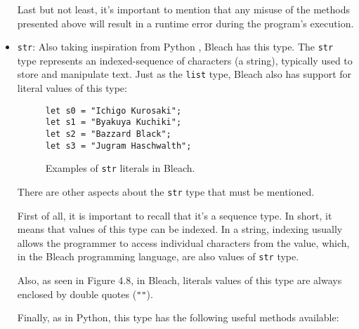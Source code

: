 \begin{itemize}
    Last but not least, it's important to mention that any misuse of the methods presented above will result in a runtime error during the program's execution.

    \item \texttt{str}: Also taking inspiration from Python \cite{python_language}, Bleach has this type. The \texttt{str} type represents an indexed-sequence of characters (a string), typically used to store and manipulate text. Just as the \texttt{list} type, Bleach also has support for literal values of this type:

    \begin{figure}[H]
        \centering
        \begin{lstlisting}
let s0 = "Ichigo Kurosaki";
let s1 = "Byakuya Kuchiki";
let s2 = "Bazzard Black";
let s3 = "Jugram Haschwalth";
        \end{lstlisting}
        \caption{Examples of \texttt{str} literals in Bleach.}
    \end{figure}

    There are other aspects about the \texttt{str} type that must be mentioned.

    First of all, it is important to recall that it's a sequence type. In short, it means that values of this type can be indexed. In a string, indexing usually allows the programmer to access individual characters from the value, which, in the Bleach programming language, are also values of \texttt{str} type.

    Also, as seen in Figure 4.8, in Bleach, literals values of this type are always enclosed by double quotes (\texttt{""}).

    Finally, as in Python, this type has the following useful methods available:


\end{itemize}

